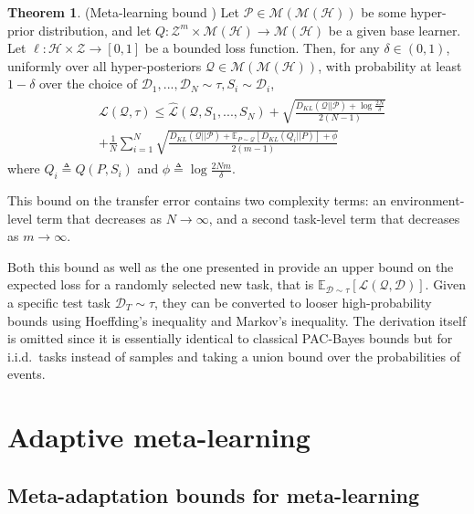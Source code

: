 \documentclass[letterpaper]{article} %
\theoremstyle{definition}
\newtheorem{theorem}{Theorem}[section]
\newcommand{\Expect}[2]{\mathbb{E}_{#1}\left [#2 \right ]}
\begin{document}
\begin{theorem} (Meta-learning bound \citep{Amit2018}) \label{thm:meta-pb}
	Let $\mathcal{P}\in \mathcal{M}(\mathcal{M}(\mathcal{H}))$ be some hyper-prior distribution, and let $Q: \mathcal{Z}^m\times\mathcal{M}(\mathcal{H})\rightarrow \mathcal{M}(\mathcal{H})$ be a given base learner. Let $\ell: \mathcal{H}\times \mathcal{Z}\rightarrow [0, 1]$ be a bounded loss function.
	Then, for any $\delta \in (0,1)$, uniformly over all hyper-posteriors $\mathcal{Q}\in \mathcal{M}(\mathcal{M}(\mathcal{H}))$, with probability at least $1-\delta$ over the choice of $\mathcal{D}_1,...,\mathcal{D}_N\sim \tau, S_i\sim \mathcal{D}_i$, 
%	
	\begin{align*} 
	\begin{split}
	&\mathcal{L}(\mathcal{Q}, \tau) \leq \hat{\mathcal{L}}(\mathcal{Q}, S_1,...,S_N) 
	+\sqrt{\frac{D_{KL}(\mathcal{Q}||\mathcal{P})+\log\frac{2N}{\delta}}{2(N-1)}} \\
	&+\frac{1}{N}\sum_{i=1}^{N}\sqrt{\frac{D_{KL}(\mathcal{Q}||\mathcal{P})+\Expect{P\sim \mathcal{Q}}{D_{KL}(Q_i||P)}+\phi}{2(m-1)}}
	\end{split}
	\end{align*}
	where $Q_i\triangleq Q(P,S_i)$ and $\phi\triangleq \log\frac{2Nm}{\delta}$.
\end{theorem}

This bound on the transfer error contains two complexity terms: an environment-level term that decreases as $N\rightarrow \infty$, and a second task-level term that decreases as $m\rightarrow \infty$. 

Both this bound as well as the one presented in \cite{Rothfuss2020} provide an upper bound on the expected loss for a randomly selected new task, that is
$\Expect{\mathcal{D}\sim \tau}{\mathcal{L}(\mathcal{Q}, \mathcal{D})}$.
Given a specific test task $\mathcal{D}_T\sim \tau$, they can be converted to looser high-probability bounds using Hoeffding's inequality and Markov's inequality. The derivation itself is omitted since it is essentially identical to classical PAC-Bayes bounds but for i.i.d.\ tasks instead of samples and taking a union bound over the probabilities of events.

\section{Adaptive meta-learning}

\subsection{Meta-adaptation bounds for meta-learning} \label{sec:adapt-general}
\end{document}
